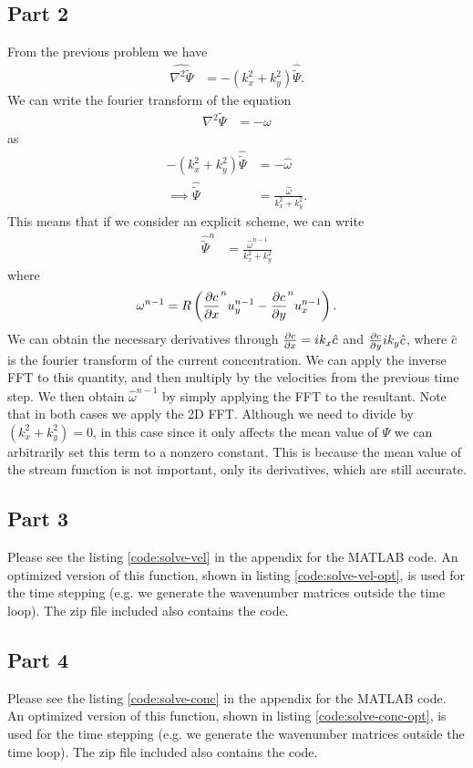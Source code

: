 \documentclass{article}
\begin{document}
\subsection{Part 2}
From the previous problem we have
\begin{align}
    \widehat{\nabla^2 \tilde{\Psi}} &= -(k^2_x + k^2_y) \hat{\tilde{\Psi}}.
\end{align}
We can write the fourier transform of the equation
\begin{align}
    \nabla^2 \tilde{\Psi} &= -\omega
\end{align}
as
\begin{align}
    -(k^2_x + k^2_y) \hat{\tilde{\Psi}} &= -\hat{\omega} \\
\implies \hat{\tilde{\Psi}} &= \frac{\hat{\omega}}{k^2_x + k^2_y}.
\end{align}
This means that if we consider an explicit scheme, we can write
\begin{align}
\hat{\tilde{\Psi}}^n &= \frac{\hat{\omega}^{n-1}}{k^2_x + k^2_y}
\end{align}
where
\begin{align}
\omega^{n-1} = R \left( \frac{\partial c}{ \partial x}^{n} u_y^{n-1} - \frac{\partial c}{ \partial y}^{n} u_x^{n-1} \right).
\end{align}
We can obtain the necessary derivatives through $\frac{\partial c}{ \partial x} = i k_x \hat{c}$ and $\frac{\partial c}{ \partial y} i k_y \hat{c}$, where $\hat{c}$ is the fourier transform of the current concentration.
We can apply the inverse FFT to this quantity, and then multiply by the velocities from the previous time step.
We then obtain $\hat{\omega}^{n-1}$ by simply applying the FFT to the resultant.
Note that in both cases we apply the 2D FFT.
Although we need to divide by $(k^2_x + k^2_y) = 0$, in this case since it only affects the mean value of $\Psi$ we can arbitrarily set this term to a nonzero constant.
This is because the mean value of the stream function is not important, only its derivatives, which are still accurate.

\subsection{Part 3}
Please see the listing \ref{code:solve-vel} in the appendix for the MATLAB code.
An optimized version of this function, shown in listing \ref{code:solve-vel-opt}, is used for the time stepping (e.g. we generate the wavenumber matrices outside the time loop).
The zip file included also contains the code.

\subsection{Part 4}
Please see the listing \ref{code:solve-conc} in the appendix for the MATLAB code.
An optimized version of this function, shown in listing \ref{code:solve-conc-opt}, is used for the time stepping (e.g. we generate the wavenumber matrices outside the time loop).
The zip file included also contains the code.
\end{document}
